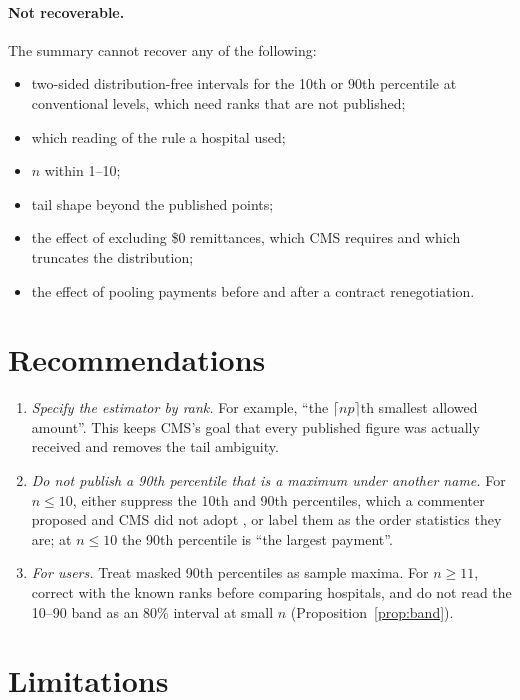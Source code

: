 \documentclass[11pt]{article}
\theoremstyle{remark}
\newcommand{\ceil}[1]{\lceil #1 \rceil}
\begin{document}
\paragraph{Not recoverable.} The summary cannot recover any of the following:
\begin{itemize}
\item two-sided distribution-free intervals for the 10th or 90th percentile at conventional levels, which need ranks that are not published;
\item which reading of the rule a hospital used;
\item $n$ within 1--10;
\item tail shape beyond the published points;
\item the effect of excluding \$0 remittances, which CMS requires \citep{cmsdd} and which truncates the distribution;
\item the effect of pooling payments before and after a contract renegotiation.
\end{itemize}

\section{Recommendations}

\begin{enumerate}
\item \emph{Specify the estimator by rank.} For example, ``the $\ceil{np}$th smallest allowed amount''. This keeps CMS's goal that every published figure was actually received and removes the tail ambiguity.
\item \emph{Do not publish a 90th percentile that is a maximum under another name.} For $n\le10$, either suppress the 10th and 90th percentiles, which a commenter proposed and CMS did not adopt \citep[][at 53998]{fr2025}, or label them as the order statistics they are; at $n\le10$ the 90th percentile is ``the largest payment''.
\item \emph{For users.} Treat masked 90th percentiles as sample maxima. For $n\ge11$, correct with the known ranks before comparing hospitals, and do not read the 10--90 band as an 80\% interval at small $n$ (Proposition~\ref{prop:band}).
\end{enumerate}

\section{Limitations}
\end{document}
